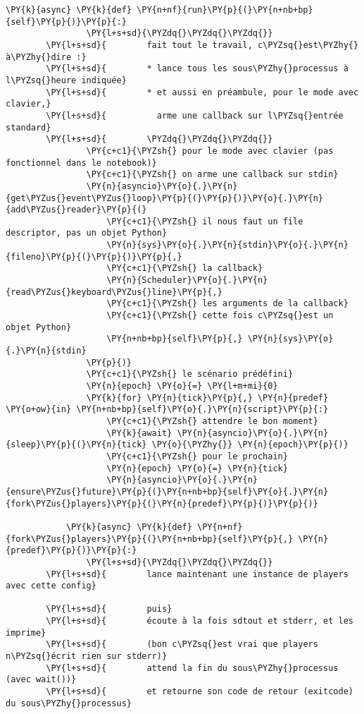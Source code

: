 \begin{Verbatim}[commandchars=\\\{\},frame=single,framerule=0.3mm,rulecolor=\color{cellframecolor}]
            \PY{k}{async} \PY{k}{def} \PY{n+nf}{run}\PY{p}{(}\PY{n+nb+bp}{self}\PY{p}{)}\PY{p}{:}
                \PY{l+s+sd}{\PYZdq{}\PYZdq{}\PYZdq{}}
        \PY{l+s+sd}{        fait tout le travail, c\PYZsq{}est\PYZhy{}à\PYZhy{}dire :}
        \PY{l+s+sd}{        * lance tous les sous\PYZhy{}processus à l\PYZsq{}heure indiquée}
        \PY{l+s+sd}{        * et aussi en préambule, pour le mode avec clavier,}
        \PY{l+s+sd}{          arme une callback sur l\PYZsq{}entrée standard}
        \PY{l+s+sd}{        \PYZdq{}\PYZdq{}\PYZdq{}}
                \PY{c+c1}{\PYZsh{} pour le mode avec clavier (pas fonctionnel dans le notebook)}
                \PY{c+c1}{\PYZsh{} on arme une callback sur stdin}
                \PY{n}{asyncio}\PY{o}{.}\PY{n}{get\PYZus{}event\PYZus{}loop}\PY{p}{(}\PY{p}{)}\PY{o}{.}\PY{n}{add\PYZus{}reader}\PY{p}{(}
                    \PY{c+c1}{\PYZsh{} il nous faut un file descriptor, pas un objet Python}
                    \PY{n}{sys}\PY{o}{.}\PY{n}{stdin}\PY{o}{.}\PY{n}{fileno}\PY{p}{(}\PY{p}{)}\PY{p}{,}
                    \PY{c+c1}{\PYZsh{} la callback}
                    \PY{n}{Scheduler}\PY{o}{.}\PY{n}{read\PYZus{}keyboard\PYZus{}line}\PY{p}{,}
                    \PY{c+c1}{\PYZsh{} les arguments de la callback}
                    \PY{c+c1}{\PYZsh{} cette fois c\PYZsq{}est un objet Python}
                    \PY{n+nb+bp}{self}\PY{p}{,} \PY{n}{sys}\PY{o}{.}\PY{n}{stdin}
                \PY{p}{)}
                \PY{c+c1}{\PYZsh{} le scénario prédéfini}
                \PY{n}{epoch} \PY{o}{=} \PY{l+m+mi}{0}
                \PY{k}{for} \PY{n}{tick}\PY{p}{,} \PY{n}{predef} \PY{o+ow}{in} \PY{n+nb+bp}{self}\PY{o}{.}\PY{n}{script}\PY{p}{:}
                    \PY{c+c1}{\PYZsh{} attendre le bon moment}
                    \PY{k}{await} \PY{n}{asyncio}\PY{o}{.}\PY{n}{sleep}\PY{p}{(}\PY{n}{tick} \PY{o}{\PYZhy{}} \PY{n}{epoch}\PY{p}{)}
                    \PY{c+c1}{\PYZsh{} pour le prochain}
                    \PY{n}{epoch} \PY{o}{=} \PY{n}{tick}
                    \PY{n}{asyncio}\PY{o}{.}\PY{n}{ensure\PYZus{}future}\PY{p}{(}\PY{n+nb+bp}{self}\PY{o}{.}\PY{n}{fork\PYZus{}players}\PY{p}{(}\PY{n}{predef}\PY{p}{)}\PY{p}{)}
        
            \PY{k}{async} \PY{k}{def} \PY{n+nf}{fork\PYZus{}players}\PY{p}{(}\PY{n+nb+bp}{self}\PY{p}{,} \PY{n}{predef}\PY{p}{)}\PY{p}{:}
                \PY{l+s+sd}{\PYZdq{}\PYZdq{}\PYZdq{}}
        \PY{l+s+sd}{        lance maintenant une instance de players avec cette config}
        
        \PY{l+s+sd}{        puis}
        \PY{l+s+sd}{        écoute à la fois sdtout et stderr, et les imprime}
        \PY{l+s+sd}{        (bon c\PYZsq{}est vrai que players n\PYZsq{}écrit rien sur stderr)}
        \PY{l+s+sd}{        attend la fin du sous\PYZhy{}processus (avec wait())}
        \PY{l+s+sd}{        et retourne son code de retour (exitcode) du sous\PYZhy{}processus}
        

\end{Verbatim}
